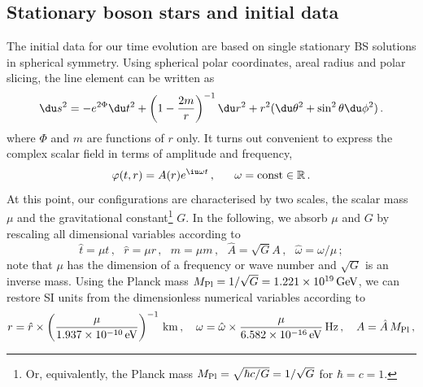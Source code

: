 \subsection{Stationary boson stars and initial data}
%
The initial data for our time evolution are based on single stationary
BS solutions in spherical symmetry.
Using spherical polar coordinates,
areal radius and polar slicing, the
line element can be written as
%
\begin{equation}
  \du s^2 =
  -e^{2\Phi} \du t^2
  + \left(1-\frac{2m}{r}\right)^{-1} \du r^2
  + r^2
  (
  \du \theta^2
  + \sin^2\theta \du \phi^2
  )\,.
  \label{mal:eq:ds2sym}
\end{equation}
%
where $\Phi$ and $m$ are functions of $r$ only.
It turns out convenient to express the complex
scalar field in terms of amplitude and frequency,
%
\begin{equation}
  \varphi(t,r) =
  A(r)
  e^{\iu \omega t}\,,~~~~~\omega = \mathrm{const}\in \mathbb{R}\,.
\end{equation}
%
At this point, our configurations are characterised by two
scales, the scalar mass $\mu$ and the gravitational
constant\footnote{Or, equivalently, the Planck mass
$M_{\rm Pl}=\sqrt{\hbar c/G}=1/\sqrt{G}$ for $\hbar=c=1$.} $G$.
In the following, we absorb $\mu$ and $G$ by rescaling all
dimensional variables according to
%
\begin{equation}
  \hat{t}=\mu t\,,~~~
  \hat{r}=\mu r\,,~~~
  \hat{m}=\mu m\,,~~~
  \hat{A}=\sqrt{G} A\,,~~~
  \hat{\omega}=\omega/\mu\,;
  \label{mal:eq:rescaling}
\end{equation}
%
note that $\mu$ has the dimension of a frequency or wave number
and $\sqrt{G}$ is an inverse mass. Using the Planck mass
$M_{\rm Pl}=1/\sqrt{G}=1.221\times10^{19}\,{\rm GeV}$, we
can restore SI units from the dimensionless numerical variables
according to
%
\begin{equation}
  r = \hat{r} \times
  \left(
  \frac{\mu}{1.937\times 10^{-10}\,{\rm eV}}
  \right)^{-1}\,{\rm km}\,,~~~
  \omega = \hat{\omega}\times
  \frac{\mu}{6.582\times 10^{-16}\,{\rm eV}}\,{\rm Hz}
  \,,~~~
  A=\hat{A}\,M_{\rm Pl}\,,
  \nonumber
\end{equation}
